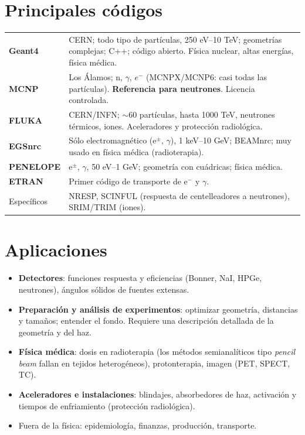 \section{Principales códigos}
\begin{dato}
\begin{tabularx}{\linewidth}{lX}
\textbf{Geant4} & CERN; todo tipo de partículas, 250 eV--10 TeV; geometrías complejas; C++; código abierto. Física nuclear, altas energías, física médica.\\
\textbf{MCNP} & Los Álamos; n, $\gamma$, $e^-$ (MCNPX/MCNP6: casi todas las partículas). \textbf{Referencia para neutrones}. Licencia controlada.\\
\textbf{FLUKA} & CERN/INFN; $\sim$60 partículas, hasta 1000 TeV, neutrones térmicos, iones. Aceleradores y protección radiológica.\\
\textbf{EGSnrc} & Sólo electromagnético (e$^\pm$, $\gamma$), 1 keV--10 GeV; BEAMnrc; muy usado en física médica (radioterapia).\\
\textbf{PENELOPE} & e$^\pm$, $\gamma$, 50 eV--1 GeV; geometría con cuádricas; física médica.\\
\textbf{ETRAN} & Primer código de transporte de e$^-$ y $\gamma$.\\
Específicos & NRESP, SCINFUL (respuesta de centelleadores a neutrones), SRIM/TRIM (iones).\\
\end{tabularx}
\end{dato}

\section{Aplicaciones}
\begin{itemize}
\item \textbf{Detectores}: funciones respuesta y eficiencias (Bonner, NaI, HPGe, neutrones), ángulos sólidos de fuentes extensas.
\item \textbf{Preparación y análisis de experimentos}: optimizar geometría, distancias y tamaños; entender el fondo. Requiere una descripción detallada de la geometría y del haz.
\item \textbf{Física médica}: dosis en radioterapia (los métodos semianalíticos tipo \emph{pencil beam} fallan en tejidos heterogéneos), protonterapia, imagen (PET, SPECT, TC).
\item \textbf{Aceleradores e instalaciones}: blindajes, absorbedores de haz, activación y tiempos de enfriamiento (protección radiológica).
\item Fuera de la física: epidemiología, finanzas, producción, transporte.
\end{itemize}

